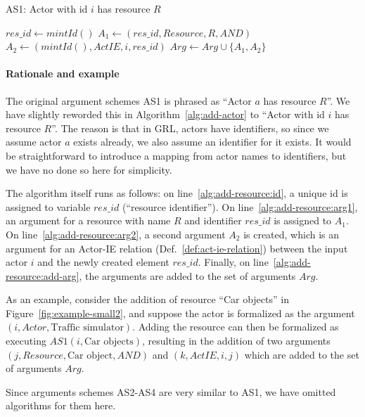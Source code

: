 \begin{algorithm}[h]
  \caption{AS1: Actor with id $i$ has resource $R$}\label{alg:add-resource}
  \begin{algorithmic}[1]
    \State $res\_id\gets mintId()$\label{alg:add-resource:id}
    \State $A_1\leftarrow (res\_id, Resource, R, AND)$\label{alg:add-resource:arg1}
    \State $A_2\leftarrow (mintId(),ActIE, i, res\_id)$\label{alg:add-resource:arg2}
    \State $Arg\gets Arg\cup \{A_1,A_2\}$\label{alg:add-resource:add-arg}
    \EndProcedure
  \end{algorithmic}
\end{algorithm}

\paragraph{Rationale and example} The original argument schemes AS1 is phrased as ``Actor $a$ has resource $R$''. We have slightly reworded this in Algorithm~\ref{alg:add-actor} to ``Actor with id $i$ has resource $R$''. The reason is that in GRL, actors have identifiers, so since we assume actor $a$ exists already, we also assume an identifier for it exists. It would be straightforward to introduce a mapping from actor names to identifiers, but we have no done so here for simplicity. 

The algorithm itself runs as follows: on line~\ref{alg:add-resource:id}, a unique id is assigned to variable $res\_id$ (``resource identifier''). On line~\ref{alg:add-resource:arg1}, an argument for a resource with name $R$ and identifier $res\_id$ is assigned to $A_1$. On line~\ref{alg:add-resource:arg2}, a second argument $A_2$ is created, which is an argument for an Actor-IE relation (Def.~\ref{def:act-ie-relation}) between the input actor $i$ and the newly created element $res\_id$. Finally, on line~\ref{alg:add-resource:add-arg}, the arguments are added to the set of arguments $Arg$.

As an example, consider the addition of resource ``Car objects'' in Figure~\ref{fig:example-small2}, and suppose the actor is formalized as the argument $(i, Actor, \text{Traffic simulator})$. Adding the resource can then be formalized as executing $AS1(i, \text{Car objects})$, resulting in the addition of two arguments $(j, Resource, \text{Car object}, AND)$ and $(k, ActIE, i, j)$ which are added to the set of arguments $Arg$.

Since arguments schemes AS2-AS4 are very similar to AS1, we have omitted algorithms for them here.

